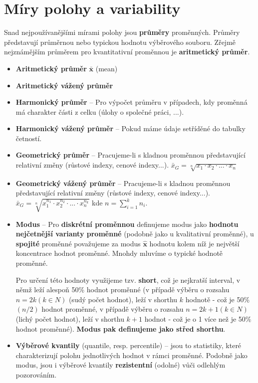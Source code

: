 \section{Míry polohy a variability}
Snad nejpoužívanějšími mírami polohy jsou \textbf{průměry} proměnných. Průměry představují průměrnou nebo typickou hodnotu výběrového souboru. Zřejmě nejznámějším průměrem pro kvantitativní proměnnou je \textbf{aritmetický průměr}.
\begin{itemize}
    \item \textbf{Aritmetický průměr} $\mathbf{\bar{x}}$ (mean)
    \item \textbf{Aritmetický vážený průměr}
    \item \textbf{Harmonický průměr}  -- Pro výpočet průměru v případech, kdy proměnná má charakter části z celku (úlohy o společné práci, ...).
    \item \textbf{Harmonický vážený průměr} -- Pokud máme údaje setříděné do tabulky četností.
    \item \textbf{Geometrický průměr} -- Pracujeme-li s kladnou proměnnou představující relativní změny (růstové indexy, cenové indexy...). $\bar{x}_G = \sqrt[n]{x_1 \cdot x_2 \cdot ... \cdot x_n}$
    \item \textbf{Geometrický vážený průměr} -- Pracujeme-li s kladnou proměnnou představující relativní změny (růstové indexy, cenové indexy...). $\bar{x}_G = \sqrt[n]{x_1^{n_1} \cdot x_2^{n_2} \cdot ... \cdot x_n^{n_k}}$ kde $n = \sum\limits_{i=1}^k n_i$. \\

    \item \textbf{Modus} -- Pro \textbf{diskrétní proměnnou} definujeme modus jako \textbf{hodnotu nejčetnější varianty proměnné} (podobně jako u kvalitativní proměnné), u \textbf{spojité} proměnné považujeme za modus $\mathbf{\hat{x}}$ hodnotu kolem níž je největší koncentrace hodnot proměnné. Mnohdy mluvíme o typické hodnotě proměnné.

          Pro určení této hodnoty využijeme tzv. \textbf{short}, což je nejkratší interval, v němž leží alespoň 50\% hodnot proměnné (v případě výběru o rozsahu $n = 2k(k \in N)$ (sudý počet hodnot), leží v shorthu $k$ hodnotě - což je 50\% $(n/2)$ hodnot proměnné, v případě výběru o rozsahu $n = 2k + 1(k \in N)$ (lichý počet hodnot), leží v shorthu $k + 1$ hodnot - což je o 1 více než je 50\% hodnot proměnné). \textbf{Modus pak definujeme jako střed shorthu}.

    \item \textbf{Výběrové kvantily} (quantile, resp. percentile) -- jsou to statistiky, které charakterizují polohu jednotlivých hodnot v rámci proměnné. Podobně jako modus, jsou i výběrové kvantily \textbf{rezistentní} (odolné) vůči odlehlým pozorováním.


\end{itemize}
